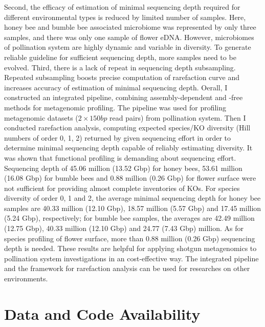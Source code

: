 \documentclass[11pt]{article}
\begin{document}
Second, the efficacy of estimation of minimal sequencing depth required for different environmental types is reduced by limited number of samples. 
Here, honey bee and bumble bee associated microbiome was represented by only three samples, and there was only one sample of flower eDNA. 
However, microbiomes of pollination system are highly dynamic and variable in diversity. 
To generate reliable guideline for sufficient sequencing depth, more samples need to be evolved. 
Third, there is a lack of repeat in sequencing depth subsampling. 
Repeated subsampling boosts precise computation of rarefaction curve and increases accuracy of estimation of minimal sequencing depth. 
\newline
Oerall, I constructed an integrated pipeline, combining assembly-dependent and -free methods for metagenomic profiling. 
The pipeline was used for profiling metagenomic datasets ($2 \times 150 bp$ read pairs) from pollination system. 
Then I conducted rarefaction analysis, computing expected species/KO diversity (Hill numbers of order 0, 1, 2) returned by given sequencing effort in order to determine minimal sequencing depth capable of reliably estimating diversity. 
It was shown that functional profiling is demanding about sequencing effort. 
Sequencing depth of 45.06 million (13.52 Gbp) for honey bees, 53.61 million (16.08 Gbp) for bumble bees and 0.88 million (0.26 Gbp) for flower surface were not sufficient for providing almost complete inventories of KOs. 
For species diversity of order 0, 1 and 2, the average minimal sequencing depth for honey bee samples are 40.33 million (12.10 Gbp), 18.57 million (5.57 Gbp) and 17.45 million (5.24 Gbp), respectively; for bumble bee samples, the averages are 42.49 million (12.75 Gbp), 40.33 million (12.10 Gbp) and 24.77 (7.43 Gbp) million. 
As for species profiling of flower surface, more than 0.88 million (0.26 Gbp) sequencing depth is needed. 
These results are helpful for applying shotgun metagenomics to pollination system investigations in an cost-effective way. 
The integrated pipeline and the framework for rarefaction analysis can be used for researches on other environments. 



\section{Data and Code Availability}
\end{document}
